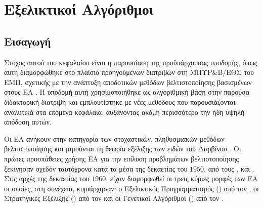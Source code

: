\chapter{Εξελικτικοί Αλγόριθμοι} %


\ifpdf
    \graphicspath{{2/figures/PNG/}{2/figures/PDF/}{2/figures/}}
\else
    \graphicspath{{2/figures/EPS/}{2/figures/}}
\fi


\section{Εισαγωγή}
Στόχος αυτού του κεφαλαίου είναι η παρουσίαση της προϋπάρχουσας υποδομής,  όπως αυτή διαμορφώθηκε στο πλαίσιο προηγούμενων διατριβών στη ΜΠΥΡ\&Β/ΕΘΣ του ΕΜΠ, σχετικής με την ανάπτυξη αποδοτικών μεθόδων βελτιστοποίησης βασισμένων στους ΕΑ \cite{phd_Giotis,phd_Karakasis,phd_Kampolis,phd_Vera,phd_Chara,phd_eugene}.  Η υποδομή αυτή \cite{EASYsite} χρησιμοποιήθηκε ως αλγοριθμική βάση στην παρούσα διδακτορική διατριβή και εμπλουτίστηκε με νέες μεθόδους που παρουσιάζονται αναλυτικά στα επόμενα κεφάλαια, αυξάνοντας ακόμη περισσότερο την ήδη υψηλή απόδοση αυτών. 

Οι EA ανήκουν στην κατηγορία των στοχαστικών, πληθυσμιακών μεθόδων βελτιστοποίησης και μιμούνται τη θεωρία εξέλιξης των ειδών του Δαρβίνου \cite{Darwin}.  Οι πρώτες προσπάθειες χρήσης ΕΑ για την επίλυση προβλημάτων βελτιστοποίησης ξεκίνησαν σχεδόν ταυτόχρονα κατά τα μέσα της δεκαετίας του $1950$, από τους  \cite{Friedberg:1958:LMP:1662346.1662347, Friedberg:1959:LMP:1661923.1661930},  \cite{Bremermann_62} και  \cite{Box57a}. Στις αρχές της δεκαετίας του $1960$, είχαν διαμορφωθεί οι τρεις κύριες μορφές των ΕΑ οι οποίες, στη συνέχεια, κυριάρχησαν: ο Εξελικτικός Προγραμματισμός () από τον  \cite{fogel62}, οι Στρατηγικές Εξέλιξης () από τον  \cite{rech65} και οι Γενετικοί Αλγόριθμοι () από τον  \cite{Holland:1962:OLT:321127.321128}.

